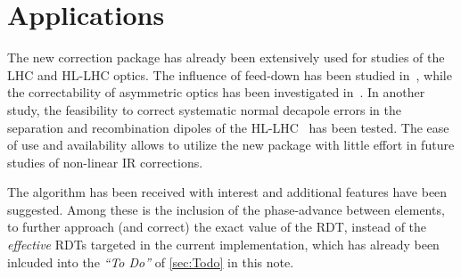 \section{Applications}

The new correction package has already been extensively used for studies of the LHC and HL-LHC optics.
The influence of feed-down has been studied in~\cite{DillyCorrectionsFeedDownNonLinear2021},
while  the  correctability  of asymmetric optics has been investigated in~\cite{DillyCorrectionsAsymmetricNonLinear2021}.
In another study, the feasibility to correct systematic normal decapole errors in the separation and 
recombination dipoles of the HL-LHC~\cite{DillyFeasibilityCorrectingSystematic2021,DillyCorrenctionsSystematicNormal2022} has been tested.
The ease of use and availability allows to utilize the new package with little effort in future studies of non-linear IR corrections.

The algorithm has been received with interest and additional features have been suggested.
Among these is the inclusion of the phase-advance between elements, 
to further approach (and correct) the exact value of the RDT, 
instead of the \textit{effective} RDTs targeted in the current implementation, which has already been inlcuded into the \textit{``To Do''} of \cref{sec:Todo} in this note.
